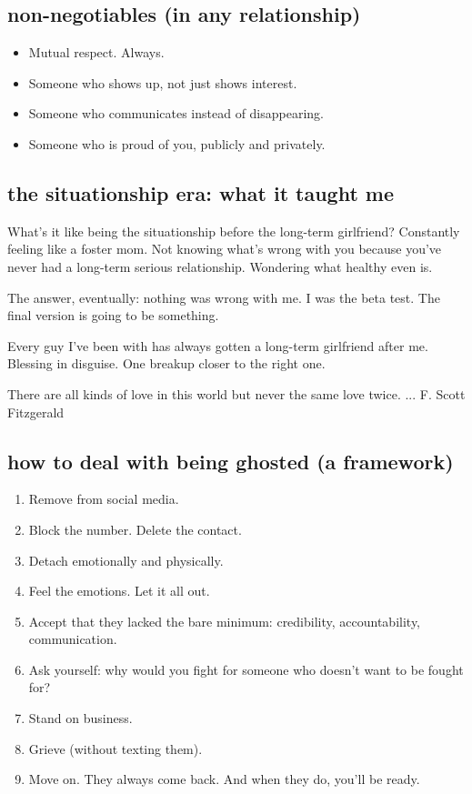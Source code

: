 \documentclass[12pt, letterpaper]{article}
\newenvironment{jadequote}{%
  \begin{mdframed}[backgroundcolor=soft, linecolor=moxie, linewidth=1pt,
    innerleftmargin=10pt, innerrightmargin=10pt,
    innertopmargin=8pt, innerbottommargin=8pt]
  \itshape
}{%
  \end{mdframed}
}
\begin{document}
\subsection{non-negotiables (in any relationship)}
\begin{itemize}
  \item Mutual respect. Always.
  \item Someone who shows up, not just shows interest.
  \item Someone who communicates instead of disappearing.
  \item Someone who is proud of you, publicly and privately.
\end{itemize}

\subsection{the situationship era: what it taught me}

\begin{jadequote}
What's it like being the situationship before the long-term girlfriend? Constantly feeling like a foster mom. Not knowing what's wrong with you because you've never had a long-term serious relationship. Wondering what healthy even is.
\end{jadequote}

The answer, eventually: nothing was wrong with me. I was the beta test. The final version is going to be something.

\begin{jadequote}
Every guy I've been with has always gotten a long-term girlfriend after me. Blessing in disguise. One breakup closer to the right one.
\end{jadequote}

\begin{jadequote}
There are all kinds of love in this world but never the same love twice. ... F. Scott Fitzgerald
\end{jadequote}

\subsection{how to deal with being ghosted (a framework)}
\begin{enumerate}[leftmargin=*, label=\arabic*.]
  \item Remove from social media.
  \item Block the number. Delete the contact.
  \item Detach emotionally and physically.
  \item Feel the emotions. Let it all out.
  \item Accept that they lacked the bare minimum: credibility, accountability, communication.
  \item Ask yourself: why would you fight for someone who doesn't want to be fought for?
  \item Stand on business.
  \item Grieve (without texting them).
  \item Move on. They always come back. And when they do, you'll be ready.
\end{enumerate}
\end{document}

